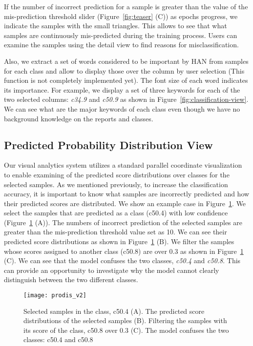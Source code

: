 If the number of incorrect prediction for a sample is greater than the value of the mis-prediction threshold slider (Figure~\ref{fig:teaser} (C)) as epochs progress, we indicate the samples with the small triangles.
This allows to see that what samples are continuously mis-predicted during the training process.
Users can examine the samples using the detail view to find reasons for misclassification.

Also, we extract a set of words considered to be important by HAN from samples for each class and allow to display those over the column by user selection (This function is not completely implemented yet).
The font size of each word indicates its importance.
For example, we display a set of three keywords for each of the two selected columns: \textit{c34.9} and \textit{c50.9} as shown in Figure~\ref{fig:classification-view}.
We can see what are the major keywords of each class even though we have no background knowledge on the reports and classes.

\subsection{Predicted Probability Distribution View}
Our visual analytics system utilizes a standard parallel coordinate visualization to enable examining of the predicted score distributions over classes for the selected samples.
As we mentioned previously, to increase the classification accuracy, it is important to know what samples are incorrectly predicted and how their predicted scores are distributed.
We show an example case in Figure~\ref{fig:prodis}.
We select the samples that are predicted as a class (c50.4) with low confidence (Figure~\ref{fig:prodis} (A)).
The numbers of incorrect prediction of the selected samples are greater than the mis-prediction threshold value set as 10.
We can see their predicted score distributions as shown in Figure~\ref{fig:prodis} (B).
We filter the samples whose scores assigned to another class (c50.8) are over 0.3 as shown in Figure~\ref{fig:prodis} (C).
We can see that the model confuses the two classes, \textit{c50.4} and \textit{c50.8}.
This can provide an opportunity to investigate why the model cannot clearly distinguish between the two different classes.

\begin{figure}[tb]
\centering
\texttt{[image: prodis\_v2]}
\caption{Selected samples in the class, c50.4 (A). The predicted score distributions of the selected samples (B). Filtering the samples with its score of the class, c50.8 over 0.3 (C). The model confuses the two classes: c50.4 and c50.8}
\label{fig:prodis}
\end{figure}

